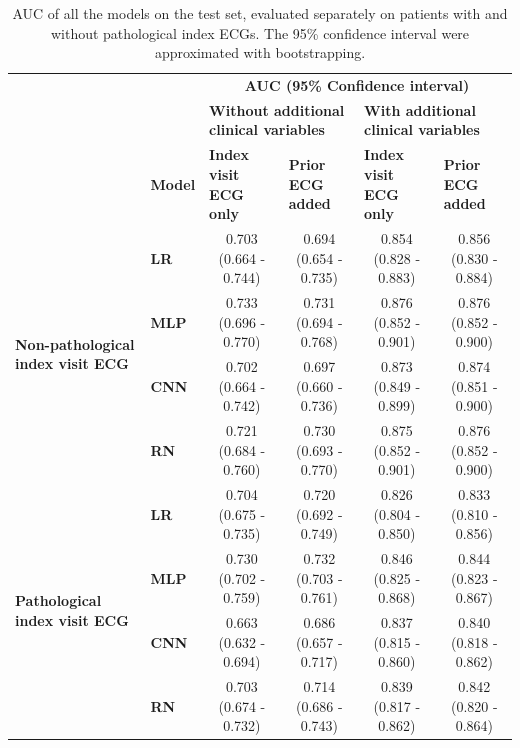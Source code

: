 \documentclass[preprint]{elsarticle}
\begin{document}
\renewcommand{\arraystretch}{1.2}
\begin{table}[H]
  \centering
  \scriptsize
\begin{adjustbox}{center}
\begin{tabular}{@{}llcccc@{}}
  \toprule
  & & \multicolumn{4}{c}{\textbf{AUC (95\% Confidence interval)}} \\
  \cmidrule(lr){3-6}
  & & \multicolumn{2}{l}{\textbf{Without additional clinical variables}} & \multicolumn{2}{l}{\textbf{With additional clinical variables}} \\
  \cmidrule(lr){3-4}\cmidrule(lr){5-6}
  & \multicolumn{1}{l}{\textbf{Model}} & \multicolumn{1}{l}{\textbf{Index visit ECG only}} & \multicolumn{1}{l}{\textbf{Prior ECG added}} & \multicolumn{1}{l}{\textbf{Index visit ECG only}} & \multicolumn{1}{l}{\textbf{Prior ECG added}} \\
  \midrule

\multirow{4}{*}{\begin{minipage}{0.65in}\textbf{Non-pathological index visit ECG}\end{minipage}} %
& \textbf{LR}  & 0.703 (0.664 - 0.744) & 0.694 (0.654 - 0.735) & 0.854 (0.828 - 0.883) & 0.856 (0.830 - 0.884) \\
& \textbf{MLP} & 0.733 (0.696 - 0.770) & 0.731 (0.694 - 0.768) & 0.876 (0.852 - 0.901) & 0.876 (0.852 - 0.900) \\
& \textbf{CNN} & 0.702 (0.664 - 0.742) & 0.697 (0.660 - 0.736) & 0.873 (0.849 - 0.899) & 0.874 (0.851 - 0.900) \\
& \textbf{RN}  & 0.721 (0.684 - 0.760) & 0.730 (0.693 - 0.770) & 0.875 (0.852 - 0.901) & 0.876 (0.852 - 0.900) \\
  \cmidrule(lr){1-2}
\multirow{4}{*}{\begin{minipage}{0.65in}\textbf{Pathological index visit ECG}\end{minipage}} %
& \textbf{LR}  & 0.704 (0.675 - 0.735) & 0.720 (0.692 - 0.749) & 0.826 (0.804 - 0.850) & 0.833 (0.810 - 0.856) \\
& \textbf{MLP} & 0.730 (0.702 - 0.759) & 0.732 (0.703 - 0.761) & 0.846 (0.825 - 0.868) & 0.844 (0.823 - 0.867) \\
& \textbf{CNN} & 0.663 (0.632 - 0.694) & 0.686 (0.657 - 0.717) & 0.837 (0.815 - 0.860) & 0.840 (0.818 - 0.862) \\
& \textbf{RN}  & 0.703 (0.674 - 0.732) & 0.714 (0.686 - 0.743) & 0.839 (0.817 - 0.862) & 0.842 (0.820 - 0.864) \\

\bottomrule
\end{tabular}
\end{adjustbox}
\caption{AUC of all the models on the test set, evaluated separately on patients with and without pathological index ECGs. The 95\% confidence interval were approximated with bootstrapping.}
\label{table:appendix:pathological}
\end{table}
\renewcommand{\arraystretch}{1}
\end{document}
